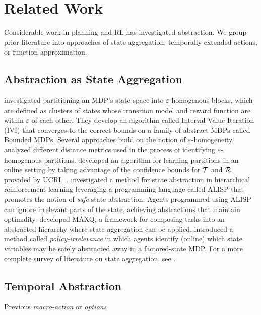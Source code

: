 \section{Related Work}

Considerable work in planning and \ac{RL} has investigated abstraction. We group prior literature into approaches of state aggregation, temporally extended actions, or function approximation.

\subsection{Abstraction as State Aggregation}

\citet{dean1997model} investigated partitioning an \ac{MDP}'s state space into $\varepsilon$-homogenous blocks, which are defined as clusters of states whose transition model and reward function are within $\varepsilon$ of each other. They develop an algorithm called Interval Value Iteration (IVI) that converges to the correct bounds on a family of abstract MDPs called Bounded \acp{MDP}. Several approaches build on the notion of $\varepsilon$-homogeneity. \citet{even2003approximate} analyzed different distance metrics used in the process of identifying $\varepsilon$-homogenous partitions. \citet{ortner2013adaptive} developed an algorithm for learning partitions in an online setting by taking advantage of the confidence bounds for $\mathcal{T}$ and $\mathcal{R}$ provided by UCRL~\cite{auer2009near}. \citet{andre2002state} investigated a method for state abstraction in hierarchical reinforcement learning leveraging a programming language called ALISP that promotes the notion of {\it safe} state abstraction. Agents programmed using ALISP can ignore irrelevant parts of the state, achieving abstractions that maintain optimality. \citet{dietterich2000hierarchical} developed MAXQ, a framework for composing tasks into an abstracted hierarchy where state aggregation can be applied. \citet{jong2005state} introduced a method called {\it policy-irrelevance} in which agents identify (online) which state variables may be safely abstracted away in a factored-state \ac{MDP}. For a more complete survey of literature on state aggregation, see \citet{li2006towards}.


\subsection{Temporal Abstraction}
Previous \textit{macro-action} or \textit{options}






